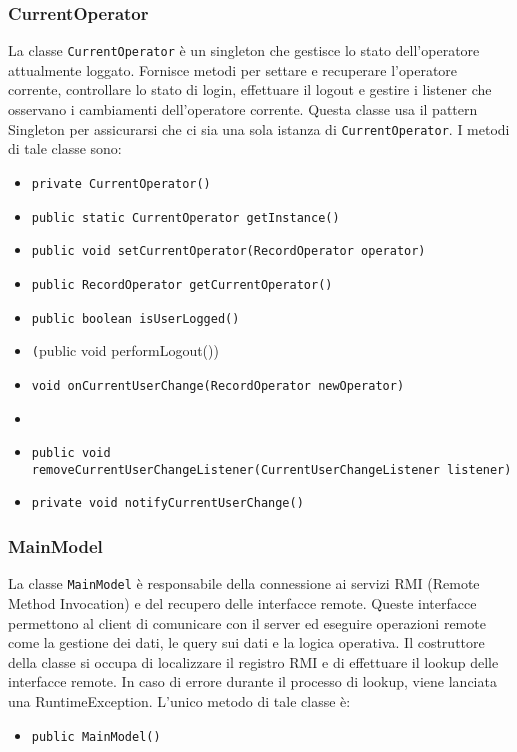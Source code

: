 \subsubsection{CurrentOperator}
La classe \texttt{CurrentOperator} è un singleton che gestisce lo stato dell'operatore attualmente loggato.
Fornisce metodi per settare e recuperare l'operatore corrente, controllare lo stato di login, effettuare il logout e gestire i listener che osservano i cambiamenti dell'operatore corrente.
Questa classe usa il pattern Singleton per assicurarsi che ci sia una sola istanza di \texttt{CurrentOperator}.
I metodi di tale classe sono:
\begin{itemize}
    \item \texttt{private CurrentOperator()}
    \item \texttt{public static CurrentOperator getInstance()}
    \item \texttt{public void setCurrentOperator(RecordOperator operator)}
    \item \texttt{public RecordOperator getCurrentOperator()}
    \item \texttt{public boolean isUserLogged()}
    \item \texttt(public void performLogout())
    \item \texttt{void onCurrentUserChange(RecordOperator newOperator)}
    \item {}
    \item \texttt{public void removeCurrentUserChangeListener(CurrentUserChangeListener listener)}
    \item \texttt{private void notifyCurrentUserChange()}
\end{itemize}

\subsubsection{MainModel}
La classe \texttt{MainModel} è responsabile della connessione ai servizi RMI (Remote Method Invocation) e del recupero delle interfacce remote. Queste interfacce permettono al client di comunicare con il server ed eseguire operazioni remote come la gestione dei dati, le query sui dati e la logica operativa.
Il costruttore della classe si occupa di localizzare il registro RMI e di effettuare il lookup delle interfacce remote. In caso di errore durante il processo di lookup, viene lanciata una RuntimeException.
L'unico metodo di tale classe è:
\begin{itemize}
    \item \texttt{public MainModel()}
\end{itemize}

